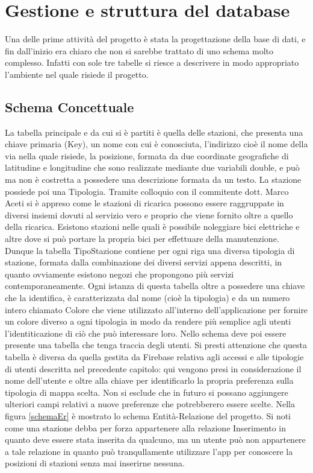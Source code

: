 \section{Gestione e struttura del database}
Una delle prime attività del progetto è stata la progettazione della base di
dati, e fin dall'inizio era chiaro che non si sarebbe trattato di uno schema
molto complesso. Infatti con sole tre tabelle si riesce a descrivere in modo
appropriato l'ambiente nel quale risiede il progetto.
\subsection{Schema Concettuale}
 La tabella principale e da cui si è partiti è
quella delle stazioni, che presenta una chiave primaria (Key), un nome con
cui è conosciuta, l'indirizzo cioè il nome della via nella quale risiede, la
posizione, formata da due coordinate geografiche di latitudine e longitudine che
sono realizzate mediante due variabili double, e
può ma non è costretta a possedere una descrizione formata da un testo. La
stazione possiede poi una Tipologia. Tramite colloquio con il commitente dott.
Marco  Aceti si è appreso come le stazioni di ricarica possono essere
raggruppate
in diversi insiemi dovuti al servizio vero e proprio che viene fornito oltre a
quello della ricarica. Esistono stazioni nelle quali è possibile noleggiare bici
elettriche e altre dove si può portare la propria bici per effettuare della manutenzione.
Dunque la tabella TipoStazione contiene per ogni riga una diversa tipologia di
stazione, formata dalla combinazione dei diversi servizi appena descritti, in
quanto ovviamente esistono negozi che propongono più servizi contemporaneamente.
Ogni istanza di questa tabella oltre a possedere una chiave che la identifica,
è caratterizzata dal nome (cioè la tipologia) e da un numero intero chiamato
Colore che viene utilizzato all'interno dell'applicazione per fornire un colore
diverso a ogni tipologia in modo da rendere più semplice agli utenti
l'identiticazione di ciò che può interessare loro. Nello schema deve poi essere
presente una tabella che tenga traccia degli utenti. Si presti attenzione che
questa tabella è diversa da quella gestita da Firebase relativa agli accessi e
alle tipologie di utenti descritta nel precedente capitolo: qui vengono presi in
considerazione il nome dell'utente e oltre alla chiave per identificarlo la
propria preferenza sulla tipologia di mappa scelta. Non si esclude che in futuro
si possano aggiungere ulteriori campi relativi a nuove preferenze che
potrebberero essere scelte. Nella figura \ref{schemaEr} è mostrato lo schema Entità-Relazione
del progetto. Si noti come una stazione debba per forza appartenere alla
relazione Inserimento in quanto deve essere stata inserita da qualcuno, ma un
utente può non appartenere a tale relazione in quanto può tranqullamente
utilizzare l'app per conoscere la posizioni di stazioni senza mai inserirne nessuna.

